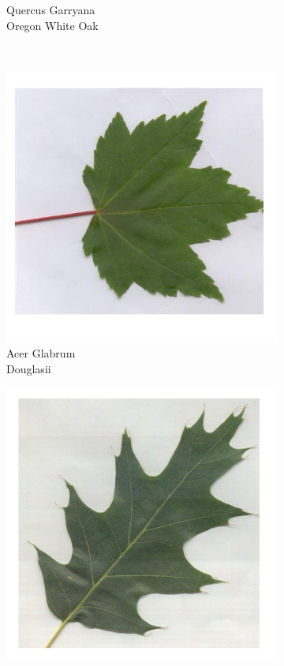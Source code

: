 \documentclass[12pt]{article}
\begin{document}
\begin{figure}[b!]
\begin{subfigure}[b]{0.3\textwidth}
        \caption{Quercus Garryana\\Oregon White Oak}
    \end{subfigure}\\
    \begin{subfigure}[b]{0.3\textwidth}
        \includegraphics[width=\textwidth]{glabrum_sample.jpg}
        \caption{Acer Glabrum\\Douglasii}
    \end{subfigure}
    \begin{subfigure}[b]{0.3\textwidth}
        \includegraphics[width=\textwidth]{kelloggii_sample.jpg}

\end{subfigure}
\end{figure}
\end{document}
